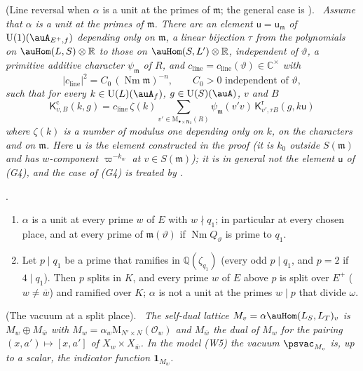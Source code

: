 \documentclass[10pt]{amsart}
\theoremstyle{definition}
\theoremstyle{remark}
\newcommand{\C}{\mathbb C}
\newcommand{\R}{\mathbb R}
\newcommand{\Q}{\mathbb Q}
\providecommand{\auNm}{\operatorname{Nm}}
\providecommand{\auO}{\mathcal O}
\providecommand{\auU}{\mathrm U}
\providecommand{\aubar}[1]{\overline{#1}}
\providecommand{\pcMat}{\mathrm M}
\providecommand{\pcm}{\mathfrak m}
\providecommand{\pguK}{\mathsf K}
\providecommand{\pgupt}{\mathsf u}
\newenvironment{quotedthm}[2]{\par\medskip\noindent\begingroup
  \textbf{#1}#2.\ \itshape\ignorespaces}{\endgroup\par\medskip}
\begin{document}
\begin{quotedthm}{\cite[Lemma~5.37]{P53}}{ (Line reversal when $\alpha$ is a unit at the primes of $\pcm$; the general case is {\cite[Lemma~6.33]{P53}})}
Assume that $\alpha$ is a unit at the primes of $\pcm$. There are an element $\pgupt=\pgupt_\pcm$ of $\auU(1)(\auA_{E^+,f})$ depending only on $\pcm$, a
linear bijection $\tau$ from the polynomials on $\auHom(L,S)\otimes\R$ to those on
$\auHom(S,L')\otimes\R$, independent of $\vartheta$, a primitive additive character $\psi_\pcm$ of
$R$, and $c_{\mathrm{line}}=c_{\mathrm{line}}(\vartheta)\in\C^\times$ with
\[
|c_{\mathrm{line}}|^2=C_0\,(\auNm\pcm)^{-n},\qquad C_0>0\text{ independent of }\vartheta,
\]
such that for every $k\in\auU(L)(\auA_f)$, $g\in\auU(S)(\auA)$, $v$ and $B$
\[
\pguK^{\mathrm c}_{v,B}(k,g)=c_{\mathrm{line}}\,\zeta(k)
\sum_{v'\in\pcMat_{\bullet\times\mathsf N_2}(R)}\psi_\pcm(v'v)\,\pguK^{\mathrm r}_{v',\tau B}(g,k\pgupt)
\]
where $\zeta(k)$ is a number of modulus one depending only on $k$, on the characters and on $\pcm$.
Here $\pgupt$ is the element constructed in the proof (it is $k_0$ outside $S(\pcm)$ and has
$w$-component $\varpi^{-k_w}$ at $v\in S(\pcm)$); it is in general not the element $\pgupt$ of
(G4), and the case of (G4) is treated by {\cite[Lemma~6.33]{P53}}.
\end{quotedthm}

\begin{quotedthm}{\cite[Proposition~6.9]{P53}}{}
\begin{enumerate}
\item[(a)] $\alpha$ is a unit at every prime $w$ of $E$ with $w\nmid q_1$; in particular at every
chosen place, and at every prime of $\pcm(\vartheta)$ if $\auNm Q_\vartheta$ is prime to $q_1$.
\item[(b)] Let $p\mid q_1$ be a prime that ramifies in $\Q(\zeta_{q_1})$ (every odd $p\mid q_1$, and
$p=2$ if $4\mid q_1$). Then $p$ splits in $K$, and every prime $w$ of $E$ above $p$ is split over $E^+$
($w\ne\aubar w$) and ramified over $K$; $\alpha$ is not a unit at the primes $w\mid p$ that divide
$\omega$.
\end{enumerate}
\end{quotedthm}

\begin{quotedthm}{\cite[Lemma~6.30]{P53}}{ (The vacuum at a split place)}
The self-dual lattice $M_v=\alpha\auHom(L_S,L_T)_v$ is $M_w\oplus M_{\aubar w}$ with
$M_w=\alpha_w\pcMat_{N'\times N}(\auO_w)$ and $M_{\aubar w}$ the dual of $M_w$ for the pairing
$(x,a')\mapsto[x,a']$ of $X_w\times X_{\aubar w}$. In the model (W5) the vacuum $\psvac_{M_v}$ is,
up to a scalar, the indicator function $\mathbf 1_{M_w}$.
\end{quotedthm}
\end{document}
